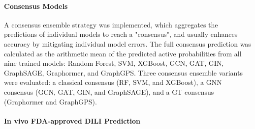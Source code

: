\documentclass[letterpaper]{article}
\begin{document}
\paragraph{Consensus Models}

A consensus ensemble strategy was implemented, which aggregates the predictions of individual models to reach a "consensus", and usually enhances accuracy by mitigating individual model errors. The full consensus prediction was calculated as the arithmetic mean of the predicted active probabilities from all nine trained models: Random Forest, SVM, XGBoost, GCN, GAT, GIN, GraphSAGE, Graphormer, and GraphGPS. Three consensus ensemble variants were evaluated: a classical consensus (RF, SVM, and XGBoost), a GNN consensus (GCN, GAT, GIN, and GraphSAGE), and a GT consensus (Graphormer and GraphGPS).

\paragraph{In vivo FDA-approved DILI Prediction}
\end{document}
